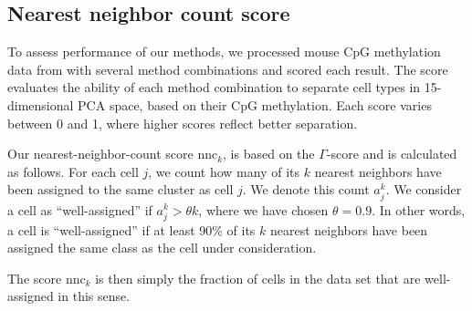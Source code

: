 \documentclass[twocolumn,10pt]{article}
\begin{document}
\subsection{Nearest neighbor count score}
To assess performance of our methods, we processed mouse CpG methylation data from \citet{luo2017single} with several method combinations and scored each result. The score evaluates the ability of each method combination to separate cell types in 15-dimensional PCA space, based on their CpG methylation. Each score varies between 0 and 1, where higher scores reflect better separation.

Our nearest-neighbor-count score $\text{nnc}_k$, is based on the $\Gamma$-score \citep{Kireeva_2014} and is calculated as follows. For each cell $j$, we count how many of its $k$ nearest neighbors have been assigned to the same cluster as cell $j$. We denote this count $a^k_j$. We consider a cell as ``well-assigned'' if $a^k_j>\theta k$, where we have chosen $\theta=0.9$. In other words, a cell is ``well-assigned'' if at least 90\% of its $k$ nearest neighbors have been assigned the same class as the cell under consideration.

The score $\text{nnc}_k$ is then simply the fraction of cells in the data set that are well-assigned in this sense.

{\small }
\end{document}
